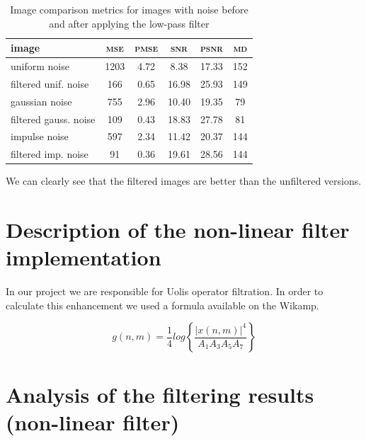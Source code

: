 \documentclass[12pt]{article}
\begin{document}
\begin{table}[H]\centering
    \begin{tabular}{l|ccccc}
        \toprule
        image                 & \textsc{mse} & \textsc{pmse} & \textsc{snr} & \textsc{psnr} & \textsc{md} \\
        \midrule[.5pt]
        uniform noise         & 1203         & 4.72          & 8.38         & 17.33         & 152         \\
        filtered unif. noise  & 166          & 0.65          & 16.98        & 25.93         & 149         \\
        \midrule[.1pt]
        gaussian noise        & 755          & 2.96          & 10.40        & 19.35         & 79          \\
        filtered gauss. noise & 109          & 0.43          & 18.83        & 27.78         & 81          \\
        \midrule[.1pt]
        impulse noise         & 597          & 2.34          & 11.42        & 20.37         & 144         \\
        filtered imp. noise   & 91           & 0.36          & 19.61        & 28.56         & 144         \\
        \bottomrule
    \end{tabular}
    \caption{Image comparison metrics for images with noise before and after applying the low-pass filter}
    \label{tab:lowpass-results-noise}
\end{table}

We can clearly see that the filtered images are better than the unfiltered versions.



\section{Description of the non-linear filter implementation }

In our project we are responsible for Uolis operator filtration. In order to calculate this enhancement we used a formula available on the Wikamp.

\begin{equation}
    g(n,m) = \frac{1}{4}log\left\{\frac{\left| x(n,m) \right|^4}{A_1A_3A_5A_7} \right\}
\end{equation}


\section{Analysis of the filtering results (non-linear filter)}
\end{document}
